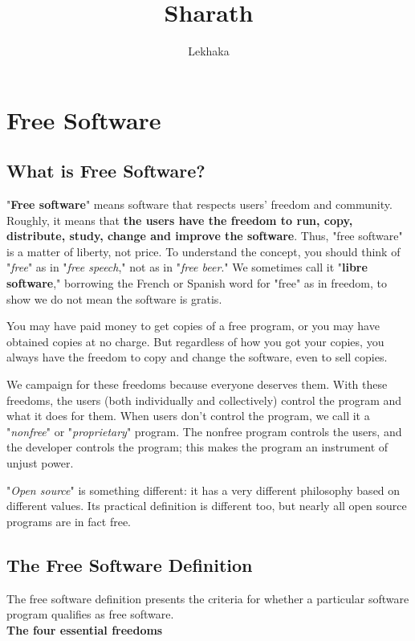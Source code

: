 \documentclass[6pt,a4paper]{report}
\author{Lekhaka}
\title{Sharath}
\begin{document}
	
	\maketitle
	\chapter{Free Software}
	\section*{What is Free Software?}
	"\textbf{Free software}" means software that respects users' freedom and community. Roughly, it means that \textbf{the users have the freedom to run, copy, distribute, study, change and improve the software}. Thus, "free software" is a matter of liberty, not price. To understand the concept, you should think of "\textit{free}" as in "\textit{free speech}," not as in "\textit{free beer}." We sometimes call it "\textbf{libre software}," borrowing the French or Spanish word for "free" as in freedom, to show we do not mean the software is gratis.
	
	You may have paid money to get copies of a free program, or you may have obtained copies at no charge. But regardless of how you got your copies, you always have the freedom to copy and change the software, even to sell copies.
	
	We campaign for these freedoms because everyone deserves them. With these freedoms, the users (both individually and collectively) control the program and what it does for them. When users don't control the program, we call it a "\textit{nonfree}" or "\textit{proprietary}" program. The nonfree program controls the users, and the developer controls the program; this makes the program an instrument of unjust power.
	
	"\emph{Open source}" is something different: it has a very different philosophy based on different values. Its practical definition is different too, but nearly all open source programs are in fact free. 
	
	\section*{The Free Software Definition}
	The free software definition presents the criteria for whether a particular software program qualifies as free software. \\
	\textbf{The four essential freedoms}		\\
	
\end{document}
